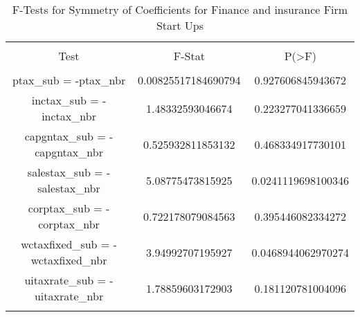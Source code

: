 
\begin{table}[!htbp] \centering 
  \caption{F-Tests for Symmetry of Coefficients for Finance and insurance Firm Start Ups} 
  \label{} 
\begin{tabular}{@{\extracolsep{5pt}} ccc} 
\\[-1.8ex]\hline 
\hline \\[-1.8ex] 
Test & F-Stat & P(\textgreater F) \\ 
\hline \\[-1.8ex] 
ptax\_sub = -ptax\_nbr & 0.00825517184690794 & 0.927606845943672 \\ 
inctax\_sub = -inctax\_nbr & 1.48332593046674 & 0.223277041336659 \\ 
capgntax\_sub = -capgntax\_nbr & 0.525932811853132 & 0.468334917730101 \\ 
salestax\_sub = -salestax\_nbr & 5.08775473815925 & 0.0241119698100346 \\ 
corptax\_sub = -corptax\_nbr & 0.722178079084563 & 0.395446082334272 \\ 
wctaxfixed\_sub = -wctaxfixed\_nbr & 3.94992707195927 & 0.0468944062970274 \\ 
uitaxrate\_sub = -uitaxrate\_nbr & 1.78859603172903 & 0.181120781004096 \\ 
\hline \\[-1.8ex] 
\end{tabular} 
\end{table} 
